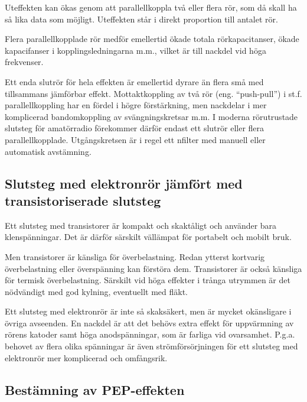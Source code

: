 Uteffekten kan ökas genom att parallellkoppla två eller flera rör, som
då skall ha så lika data som möjligt. Uteffekten står i direkt
proportion till antalet rör.

Flera parallellkopplade rör medför emellertid ökade totala
rörkapacitanser, ökade kapacifanser i kopplingsledningarna m.m.,
vilket är till nackdel vid höga frekvenser.

Ett enda slutrör för hela effekten är emellertid dyrare än flera små
med tillsammans jämförbar effekt. Mottaktkoppling av två rör
(eng. ``push-pull'') i st.f. parallellkoppling har en fördel i högre
förstärkning, men nackdelar i mer komplicerad bandomkoppling av
svängningskretsar m.m. I moderna rörutrustade slutsteg för amatörradio
förekommer därför endast ett slutrör eller flera
parallellkopplade. Utgångskretsen är i regel ett nfilter med manuell
eller automatisk avstämning.

\subsection{Slutsteg med elektronrör jämfört med transistoriserade slutsteg}

Ett slutsteg med transistorer är kompakt och skaktåligt och använder
bara klenspänningar. Det är därför särskilt vällämpat för portabelt
och mobilt bruk.

Men transistorer är känsliga för överbelastning. Redan ytterst
kortvarig överbelastning eller överspänning kan förstöra dem.
Transistorer är också känsliga för termisk överbelastning. Särskilt
vid höga effekter i trånga utrymmen är det nödvändigt med god kylning,
eventuellt med fläkt.

Ett slutsteg med elektronrör är inte så skaksäkert, men är mycket
okänsligare i övriga avseenden. En nackdel är att det behövs extra
effekt för uppvärmning av rörens katoder samt höga anodspänningar, som
är farliga vid ovarsamhet. P.g.a. behovet av flera olika spänningar är
även strömförsörjningen för ett slutsteg med elektronrör mer
komplicerad och omfångsrik.

\subsection{Bestämning av PEP-effekten}

